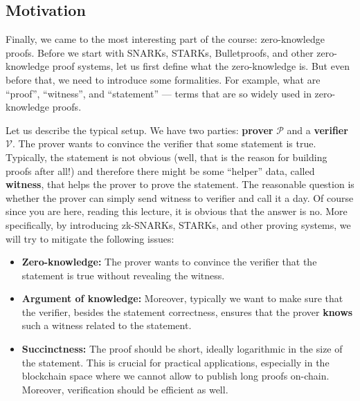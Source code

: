 \documentclass[../lecture-notes-148x210.tex]{subfiles}
\begin{document}
\subsection{Motivation}

Finally, we came to the most interesting part of the course: zero-knowledge proofs. Before we start with SNARKs, 
STARKs, Bulletproofs, and other zero-knowledge proof systems, let us first define what the zero-knowledge is. But even before 
that, we need to introduce some formalities. For example, what are ``proof'', ``witness'', and ``statement'' --- terms that are so widely used in zero-knowledge proofs.

Let us describe the typical setup. We have two parties: \textbf{prover} $\mathcal{P}$ and a \textbf{verifier} $\mathcal{V}$. The prover wants to convince the verifier that some statement is true. Typically, the statement is not obvious (well, that is the reason for building proofs after all!) and therefore there might be some ``helper'' data, called \textbf{witness}, that helps the prover to prove the statement. The reasonable question is whether the prover can simply send witness to verifier and call it a day. Of course since you are here, reading this lecture, it is obvious that the answer is no. More specifically, by introducing zk-SNARKs, STARKs, and other proving systems, we will try to mitigate the following issues:

\vspace{2mm}

\begin{itemize}
    \item \textbf{Zero-knowledge:} The prover wants to convince the verifier that the statement is true without revealing the witness. 
    \item \textbf{Argument of knowledge:} Moreover, typically we want to make sure that the verifier, besides the statement correctness, ensures that the prover \textbf{knows} such a witness related to the statement.
    \item \textbf{Succinctness:} The proof should be short, ideally logarithmic in the size of the statement. This is crucial for practical applications, especially in the blockchain space where we cannot allow to publish long proofs on-chain. Moreover, verification should be efficient as well.
\end{itemize}
\end{document}
